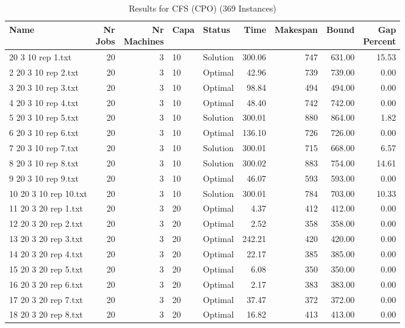 \begin{longtable}{lrrllrrrr}
\caption{Results for CFS (CPO) (369 Instances)}\\\toprule
Name & \shortstack{Nr\\Jobs} & \shortstack{Nr\\Machines} & Capa & Status  & Time & Makespan & Bound & \shortstack{Gap\\Percent}\\ \midrule
\endhead
\bottomrule
\endfoot
1 20 3 10 rep 1.txt & 20 & 3 & 10 & Solution & 300.06 & 747 & 631.00 & 15.53\\
2 20 3 10 rep 2.txt & 20 & 3 & 10 & Optimal & 42.96 & 739 & 739.00 &  0.00\\
3 20 3 10 rep 3.txt & 20 & 3 & 10 & Optimal & 98.84 & 494 & 494.00 &  0.00\\
4 20 3 10 rep 4.txt & 20 & 3 & 10 & Optimal & 48.40 & 742 & 742.00 &  0.00\\
5 20 3 10 rep 5.txt & 20 & 3 & 10 & Solution & 300.01 & 880 & 864.00 &  1.82\\
6 20 3 10 rep 6.txt & 20 & 3 & 10 & Optimal & 136.10 & 726 & 726.00 &  0.00\\
7 20 3 10 rep 7.txt & 20 & 3 & 10 & Solution & 300.01 & 715 & 668.00 &  6.57\\
8 20 3 10 rep 8.txt & 20 & 3 & 10 & Solution & 300.02 & 883 & 754.00 & 14.61\\
9 20 3 10 rep 9.txt & 20 & 3 & 10 & Optimal & 46.07 & 593 & 593.00 &  0.00\\
10 20 3 10 rep 10.txt & 20 & 3 & 10 & Solution & 300.01 & 784 & 703.00 & 10.33\\
11 20 3 20 rep 1.txt & 20 & 3 & 20 & Optimal &  4.37 & 412 & 412.00 &  0.00\\
12 20 3 20 rep 2.txt & 20 & 3 & 20 & Optimal &  2.52 & 358 & 358.00 &  0.00\\
13 20 3 20 rep 3.txt & 20 & 3 & 20 & Optimal & 242.21 & 420 & 420.00 &  0.00\\
14 20 3 20 rep 4.txt & 20 & 3 & 20 & Optimal & 22.17 & 385 & 385.00 &  0.00\\
15 20 3 20 rep 5.txt & 20 & 3 & 20 & Optimal &  6.08 & 350 & 350.00 &  0.00\\
16 20 3 20 rep 6.txt & 20 & 3 & 20 & Optimal &  2.17 & 383 & 383.00 &  0.00\\
17 20 3 20 rep 7.txt & 20 & 3 & 20 & Optimal & 37.47 & 372 & 372.00 &  0.00\\
18 20 3 20 rep 8.txt & 20 & 3 & 20 & Optimal & 16.82 & 413 & 413.00 &  0.00\\

\end{longtable}
